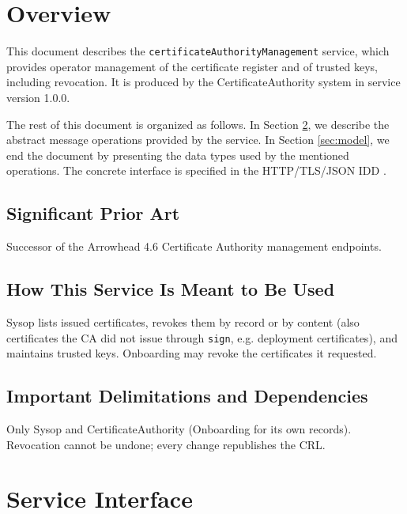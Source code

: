 \documentclass[a4paper]{arrowhead}
\begin{document}
\section{Overview}
\label{sec:overview}

This document describes the \texttt{certificate\allowbreak{}Authority\allowbreak{}Management} service, which provides operator management of the certificate register and of trusted keys, including revocation.
It is produced by the CertificateAuthority system \cite{cau-sysd} in service version 1.0.0.

The rest of this document is organized as follows.
In Section \ref{sec:operations}, we describe the abstract message operations provided by the service.
In Section \ref{sec:model}, we end the document by presenting the data types used by the mentioned operations.
The concrete interface is specified in the HTTP/TLS/JSON IDD \cite{cau-certificateAuthorityManagement-http-idd}.

\subsection{Significant Prior Art}

Successor of the Arrowhead 4.6 Certificate Authority management endpoints.

\subsection{How This Service Is Meant to Be Used}

Sysop lists issued certificates, revokes them by record or by content (also certificates the CA did not issue through \texttt{sign}, e.g. deployment certificates), and maintains trusted keys. Onboarding may revoke the certificates it requested.

\subsection{Important Delimitations and Dependencies}
\label{sec:delimitations}

Only Sysop and Certificate\allowbreak{}Authority (Onboarding for its own records). Revocation cannot be undone; every change republishes the CRL.

\newpage

\section{Service Interface}
\label{sec:operations}
\end{document}
